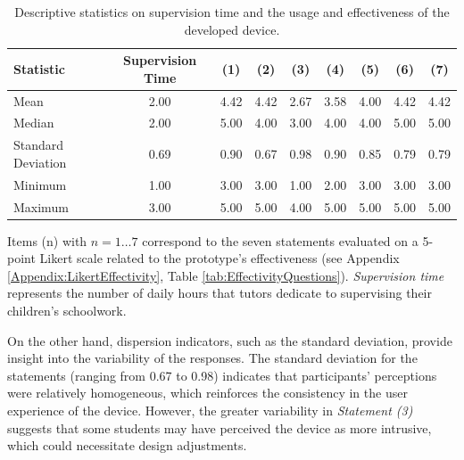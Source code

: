                 \begin{table}[h]
                    \centering
                    \caption{Descriptive statistics on supervision time and the usage and effectiveness of the developed device.}
                    \begin{tabularx}{0.85\textwidth}{Xcccccccc}
                        \toprule
                        \textbf{Statistic} & \textbf{Supervision Time} & \textbf{(1)} & \textbf{(2)} & \textbf{(3)} & \textbf{(4)} & \textbf{(5)} & \textbf{(6)} & \textbf{(7)} \\
                        \midrule
                        Mean & 2.00 & 4.42 & 4.42 & 2.67 & 3.58 & 4.00 & 4.42 & 4.42 \\
                        Median & 2.00 & 5.00 & 4.00 & 3.00 & 4.00 & 4.00 & 5.00 & 5.00 \\
                        Standard Deviation & 0.69 & 0.90 & 0.67 & 0.98 & 0.90 & 0.85 & 0.79 & 0.79 \\
                        Minimum & 1.00 & 3.00 & 3.00 & 1.00 & 2.00 & 3.00 & 3.00 & 3.00 \\
                        Maximum & 3.00 & 5.00 & 5.00 & 4.00 & 5.00 & 5.00 & 5.00 & 5.00 \\
                        \bottomrule
                    \end{tabularx}
                    \label{table:DescriptiveStatistics}
                    \vspace{0.3em} %
                    \parbox{0.85\textwidth}{\footnotesize
                        Items (n) with $n=1\ldots7$ correspond to the seven statements evaluated on a 5-point Likert scale related to the prototype’s effectiveness (see Appendix \ref{Appendix:LikertEffectivity}, Table \ref{tab:EffectivityQuestions}). \textit{Supervision time} represents the number of daily hours that tutors dedicate to supervising their children’s schoolwork.
                    }
                \end{table}
                
                On the other hand, dispersion indicators, such as the standard deviation, provide insight into the variability of the responses. The standard deviation for the statements (ranging from 0.67 to 0.98) indicates that participants' perceptions were relatively homogeneous, which reinforces the consistency in the user experience of the device. However, the greater variability in \textit{Statement (3)} suggests that some students may have perceived the device as more intrusive, which could necessitate design adjustments.
                
